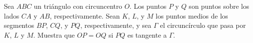 Sea $ABC$ un triángulo con circuncentro $O$. Los puntos $P$ y $Q$ son puntos sobre los lados $CA$ y $AB$, respectivamente. Sean $K$, $L$, y $M$ los puntos medios de los segmentos $BP$, $CQ$, y $PQ$, respectivamente, y sea $\Gamma$ el circuncírculo que pasa por $K$, $L$ y $M$. Muestra que $OP=OQ$ si $PQ$ es tangente a $\Gamma$.
